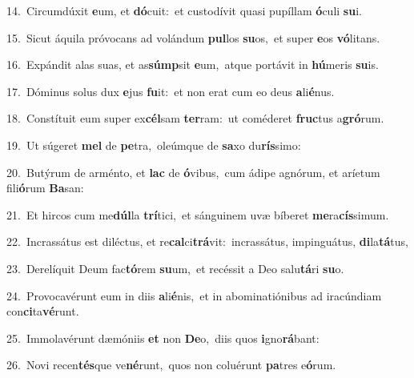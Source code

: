 {\numbfont\textcolor{\numbcolor}{14.}}~Circumdúxit \textbf{e}\-um, et \textbf{dó}\-cuit:~\star et custodívit quasi pupíllam \textbf{ó}\-culi \textbf{su}\-i.\par
{\numbfont\textcolor{\numbcolor}{15.}}~Sicut áquila próvocans ad volándum \textbf{pul}\-los \textbf{su}\-os,~\star et super \textbf{e}\-os \textbf{vó}\-litans.\par
{\numbfont\textcolor{\numbcolor}{16.}}~Expándit alas suas, et as\-\textbf{súmp}\-sit \textbf{e}\-um,~\star atque portávit in \textbf{hú}\-meris \textbf{su}\-is.\par
{\numbfont\textcolor{\numbcolor}{17.}}~Dóminus solus dux \textbf{e}\-jus \textbf{fu}\-it:~\star et non erat cum eo deus \textbf{a}\-li\-\textbf{é}\-nus.\par
{\numbfont\textcolor{\numbcolor}{18.}}~Constítuit eum super ex\-\textbf{cél}\-sam \textbf{ter}\-ram:~\star ut coméderet \textbf{fruc}\-tus a\-\textbf{gró}\-rum.\par
{\numbfont\textcolor{\numbcolor}{19.}}~Ut súgeret \textbf{mel} de \textbf{pe}\-tra,~\star oleúmque de \textbf{sa}\-xo du\-\textbf{rís}\-simo:\par
{\numbfont\textcolor{\numbcolor}{20.}}~Butýrum de arménto, et \textbf{lac} de \textbf{ó}\-vibus,~\star cum ádipe agnórum, et aríetum fili\-\textbf{ó}\-rum \textbf{Ba}\-san:\par
{\numbfont\textcolor{\numbcolor}{21.}}~Et hircos cum me\-\textbf{dúl}\-la \textbf{trí}\-tici,~\star et sánguinem uvæ bíberet \textbf{me}\-ra\-\textbf{cís}\-simum.\par
{\numbfont\textcolor{\numbcolor}{22.}}~Incrassátus est diléctus, et re\-\textbf{cal}\-ci\-\textbf{trá}\-vit:~\star incrassátus, impinguátus, \textbf{di}\-la\-\textbf{tá}\-tus,\par
{\numbfont\textcolor{\numbcolor}{23.}}~Derelíquit Deum fac\-\textbf{tó}\-rem \textbf{su}\-um,~\star et recéssit a Deo salu\-\textbf{tá}\-ri \textbf{su}\-o.\par
{\numbfont\textcolor{\numbcolor}{24.}}~Provocavérunt eum in diis \textbf{a}\-li\-\textbf{é}\-nis,~\star et in abominatiónibus ad iracúndiam con\-\textbf{ci}\-ta\-\textbf{vé}\-runt.\par
{\numbfont\textcolor{\numbcolor}{25.}}~Immolavérunt dæmóniis \textbf{et} non \textbf{De}\-o,~\star diis quos \textbf{i}\-gno\-\textbf{rá}\-bant:\par
{\numbfont\textcolor{\numbcolor}{26.}}~Novi recen\-\textbf{tés}\-que ve\-\textbf{né}\-runt,~\star quos non coluérunt \textbf{pa}\-tres e\-\textbf{ó}\-rum.\par
